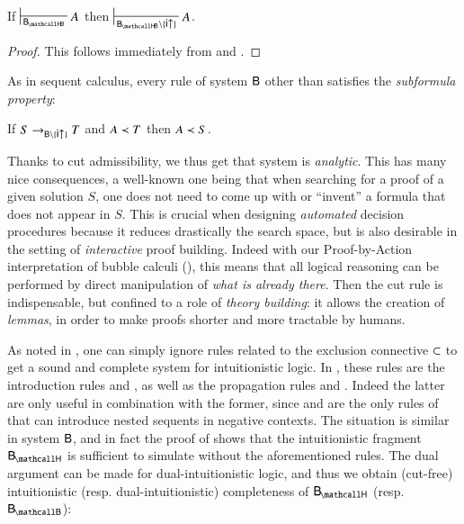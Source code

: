 \begin{corollary}\label{cor:cut-admissibility}

  If $\prov{\sysBHB} A$ then $\prov{\sysBHB \setminus \{\rsf{i{\uparrow}}\}} A$.
\end{corollary}
\begin{proof}
  This follows immediately from  and
  .
\end{proof}

As in sequent calculus, every rule of system $\sysB$ other than
 satisfies the \emph{subformula property}:

\begin{fact}\label{cor:subformula-property}
  If $S \step_{\sysB \setminus \{\rsf{i{\uparrow}}\}} T$ and $A \prec T$ then
  $A \prec S$.
\end{fact}

Thanks to cut admissibility, we thus get that system  is \emph{analytic}.
This has many nice consequences, a well-known one being that when searching for
a proof of a given solution $S$, one does not need to come up with or ``invent''
a formula that does not appear in $S$. This is crucial when designing
\emph{automated} decision procedures because it reduces drastically the search
space, but is also desirable in the setting of \emph{interactive} proof
building. Indeed with our Proof-by-Action interpretation of bubble calculi
(), this means that all logical reasoning can be performed
by direct manipulation of \emph{what is already there}. Then the cut rule is
indispensable, but confined to a role of \emph{theory building}: it allows the
creation of \emph{lemmas}, in order to make proofs shorter and more tractable by
humans.

As noted in \cite{postniece_deep_2009}, one can simply ignore rules related to
the exclusion connective $\subset$ to get a sound and complete system for
intuitionistic logic. In , these rules are the introduction rules
 and , as well as the propagation rules
 and . Indeed the latter are only useful in
combination with the former, since  and  are the
only rules of  that can introduce nested sequents in negative
contexts. The situation is similar in system $\sysB$, and in fact the proof of
 shows that the intuitionistic fragment $\sysBH$ is
sufficient to simulate  without the aforementioned rules. The dual
argument can be made for dual-intuitionistic logic, and thus we obtain
(cut-free) intuitionistic (resp. dual-intuitionistic) completeness of $\sysBH$
(resp. $\sysBB$):

